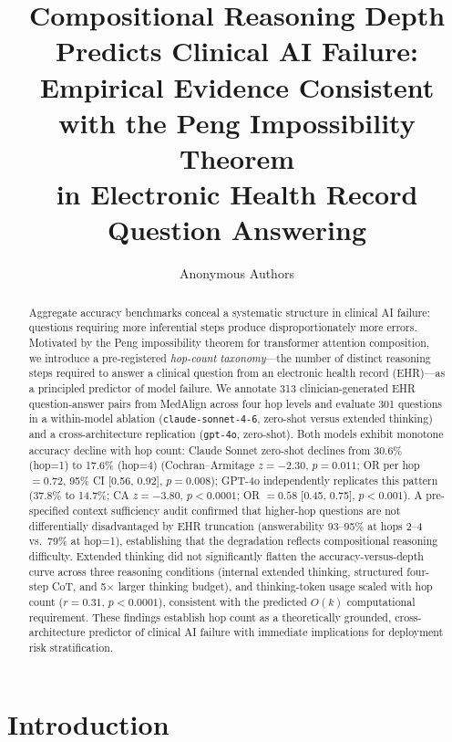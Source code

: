 \documentclass{article}
\title{Compositional Reasoning Depth Predicts Clinical AI Failure:\\
Empirical Evidence Consistent with the Peng Impossibility Theorem\\
in Electronic Health Record Question Answering}
\author{Anonymous Authors}
\begin{document}
\maketitle

\begin{abstract}
Aggregate accuracy benchmarks conceal a systematic structure in clinical AI failure:
questions requiring more inferential steps produce disproportionately more errors.
Motivated by the Peng impossibility theorem for transformer attention composition,
we introduce a pre-registered \emph{hop-count taxonomy}---the number of distinct
reasoning steps required to answer a clinical question from an electronic health
record (EHR)---as a principled predictor of model failure.
We annotate 313 clinician-generated EHR question-answer pairs from MedAlign
across four hop levels and evaluate 301 questions in a within-model ablation
(\texttt{claude-sonnet-4-6}, zero-shot versus extended thinking) and a
cross-architecture replication (\texttt{gpt-4o}, zero-shot).
Both models exhibit monotone accuracy decline with hop count:
Claude Sonnet zero-shot declines from 30.6\% (hop=1) to 17.6\% (hop=4)
(Cochran--Armitage $z = -2.30$, $p = 0.011$; OR per hop $= 0.72$,
95\% CI [0.56, 0.92], $p = 0.008$); GPT-4o independently replicates this
pattern (37.8\% to 14.7\%; CA $z = -3.80$, $p < 0.0001$; OR $= 0.58$
[0.45, 0.75], $p < 0.001$).
A pre-specified context sufficiency audit confirmed that higher-hop questions
are not differentially disadvantaged by EHR truncation (answerability
93--95\% at hops 2--4 vs.\ 79\% at hop=1), establishing that the
degradation reflects compositional reasoning difficulty.
Extended thinking did not significantly flatten the accuracy-versus-depth curve
across three reasoning conditions (internal extended thinking, structured
four-step CoT, and 5$\times$ larger thinking budget), and thinking-token usage
scaled with hop count ($r = 0.31$, $p < 0.0001$), consistent with the
predicted $O(k)$ computational requirement.
These findings establish hop count as a theoretically grounded, cross-architecture
predictor of clinical AI failure with immediate implications for deployment
risk stratification.
\end{abstract}

\section{Introduction}
\end{document}
